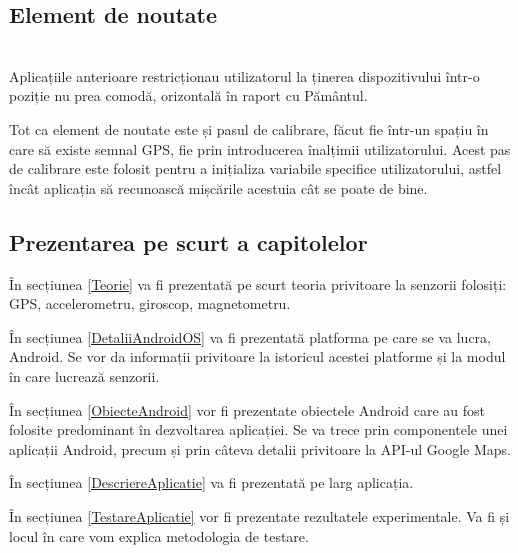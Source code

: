 \documentclass[12pt, a4paper, oneside]{article}
\begin{document}
\subsection{Element de noutate}
\\

Aplicațiile anterioare restricționau utilizatorul la ținerea dispozitivului într-o poziție nu prea comodă, orizontală în raport cu Pământul.

Tot ca element de noutate este și pasul de calibrare, făcut fie într-un spațiu în care să existe semnal GPS, fie prin introducerea înalțimii utilizatorului. Acest pas de calibrare este folosit pentru a inițializa variabile specifice utilizatorului, astfel încât aplicația să recunoască mișcările acestuia cât se poate de bine.


\subsection{Prezentarea pe scurt a capitolelor}

În secțiunea \ref{Teorie} va fi prezentată pe scurt teoria privitoare la senzorii folosiți: GPS, accelerometru, giroscop, magnetometru.

În secțiunea \ref{DetaliiAndroidOS} va fi prezentată platforma pe care se va lucra, Android. Se vor da informații privitoare la istoricul acestei platforme și la modul în care lucrează senzorii.

În secțiunea \ref{ObiecteAndroid} vor fi prezentate obiectele Android care au fost folosite predominant în dezvoltarea aplicației. Se va trece prin componentele unei aplicații Android, precum și prin câteva detalii privitoare la API-ul Google Maps.

În secțiunea \ref{DescriereAplicatie} va fi prezentată pe larg aplicația.

În secțiunea \ref{TestareAplicatie} vor fi prezentate rezultatele experimentale. Va fi și locul în care vom explica metodologia de testare.
\end{document}
